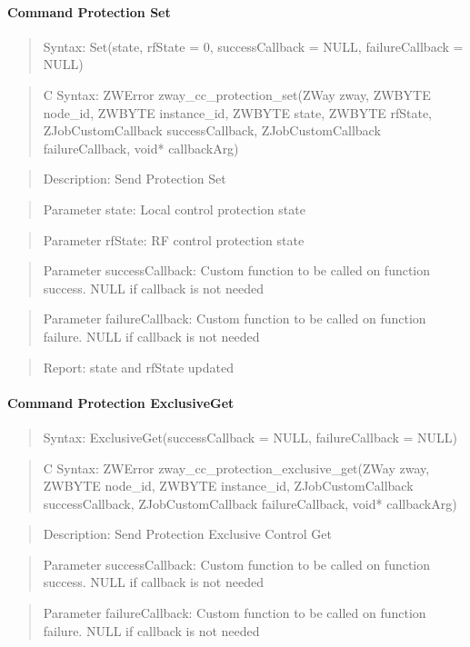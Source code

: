 \paragraph{Command Protection Set}
\begin{quote}Syntax: Set(state, rfState = 0, successCallback = NULL, failureCallback = NULL)\end{quote}
\begin{quote}C Syntax: ZWError zway\_cc\_protection\_set(ZWay zway, ZWBYTE node\_id, ZWBYTE instance\_id, ZWBYTE state, ZWBYTE rfState, ZJobCustomCallback successCallback, ZJobCustomCallback failureCallback, void* callbackArg)\end{quote}
\begin{quote}Description: Send Protection Set\end{quote}
\begin{quote}Parameter state: Local control protection state\end{quote}
\begin{quote}Parameter rfState: RF control protection state\end{quote}
\begin{quote}Parameter successCallback: Custom function to be called on function success. NULL if callback is not needed\end{quote}
\begin{quote}Parameter failureCallback: Custom function to be called on function failure. NULL if callback is not needed\end{quote}
\begin{quote}Report: state and rfState updated\end{quote}

\paragraph{Command Protection ExclusiveGet}
\begin{quote}Syntax: ExclusiveGet(successCallback = NULL, failureCallback = NULL)\end{quote}
\begin{quote}C Syntax: ZWError zway\_cc\_protection\_exclusive\_get(ZWay zway, ZWBYTE node\_id, ZWBYTE instance\_id, ZJobCustomCallback successCallback, ZJobCustomCallback failureCallback, void* callbackArg)\end{quote}
\begin{quote}Description: Send Protection Exclusive Control Get\end{quote}
\begin{quote}Parameter successCallback: Custom function to be called on function success. NULL if callback is not needed\end{quote}
\begin{quote}Parameter failureCallback: Custom function to be called on function failure. NULL if callback is not needed\end{quote}


